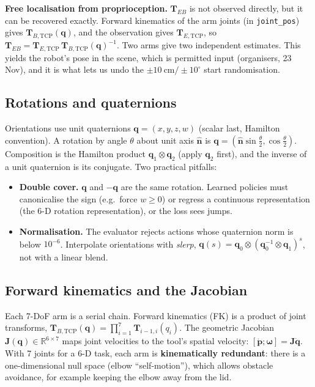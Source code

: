 \documentclass[10pt,a4paper]{article}
\newcommand{\R}{\mathbb{R}}
\begin{document}
\begin{keypt}\footnotesize\textbf{Free localisation from proprioception.} $\bm T_{EB}$ is not observed directly, but it can be recovered exactly. Forward kinematics of the arm joints (in \texttt{joint\_pos}) gives $\bm T_{B,\mathrm{TCP}}(\bm q)$, and the observation gives $\bm T_{E,\mathrm{TCP}}$, so
$\bm T_{EB}=\bm T_{E,\mathrm{TCP}}\,\bm T_{B,\mathrm{TCP}}(\bm q)^{-1}.$
Two arms give two independent estimates. This yields the robot's pose in the scene, which is permitted input (organisers, 23 Nov), and it is what lets us undo the $\pm\SI{10}{\centi\metre}/\pm10^\circ$ start randomisation.\end{keypt}

\subsection{Rotations and quaternions}
Orientations use unit quaternions $\bm q=(x,y,z,w)$ (scalar last, Hamilton convention). A rotation by angle $\theta$ about unit axis $\hat{\bm n}$ is $\bm q=(\hat{\bm n}\sin\tfrac\theta2,\cos\tfrac\theta2)$. Composition is the Hamilton product $\bm q_1\otimes\bm q_2$ (apply $\bm q_2$ first), and the inverse of a unit quaternion is its conjugate. Two practical pitfalls:
\begin{itemize}
\item \textbf{Double cover.} $\bm q$ and $-\bm q$ are the same rotation. Learned policies must canonicalise the sign (e.g.\ force $w\ge0$) or regress a continuous representation (the 6-D rotation representation), or the loss sees jumps.
\item \textbf{Normalisation.} The evaluator rejects actions whose quaternion norm is below $10^{-6}$. Interpolate orientations with \emph{slerp}, $\bm q(s)=\bm q_0\otimes(\bm q_0^{-1}\otimes\bm q_1)^s$, not with a linear blend.
\end{itemize}

\subsection{Forward kinematics and the Jacobian}
Each 7-DoF arm is a serial chain. Forward kinematics (FK) is a product of joint transforms, $\bm T_{B,\mathrm{TCP}}(\bm q)=\prod_{i=1}^{7}\bm T_{i-1,i}(q_i)$. The geometric Jacobian $\bm J(\bm q)\in\R^{6\times7}$ maps joint velocities to the tool's spatial velocity: $[\dot{\bm p};\bm\omega]=\bm J\dot{\bm q}$. With 7 joints for a 6-D task, each arm is \textbf{kinematically redundant}: there is a one-dimensional null space (elbow ``self-motion''), which allows obstacle avoidance, for example keeping the elbow away from the lid.
\end{document}
